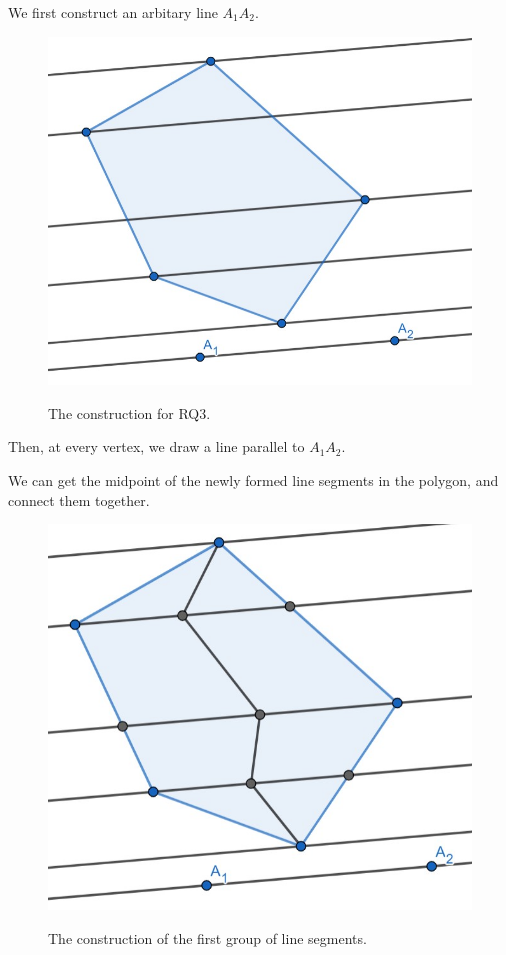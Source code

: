 \documentclass[12pt]{scrartcl}
\begin{document}
We first construct an arbitary line $A_{1}A_{2}$. 

\begin{figure}[htpb]
	\centering
	\includegraphics[scale=.75]{images/rq3_1_1.jpg}
	\label{fig:rq3_1_1_img}
	\caption{The construction for RQ3.}
\end{figure}

Then, at every vertex, we draw a line parallel to $A_{1}A_{2}$.
\pagebreak

We can get the midpoint of the newly formed line segments in the polygon, and connect them together.

\begin{figure}[htpb]
	\centering
	\includegraphics[scale=.75]{images/rq3_1_2.jpg}
	\label{fig:rq3_1_2_img}
	\caption{The construction of the first group of line segments.}
\end{figure}
\end{document}
